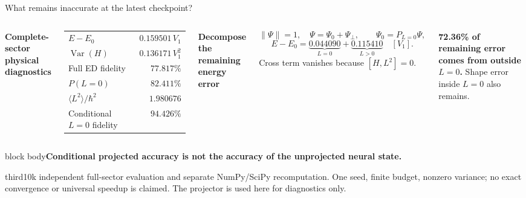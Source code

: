 \documentclass[aspectratio=169,10pt]{beamer}
\newcommand{\src}[1]{\vfill{\fontsize{6.3}{7.5}\selectfont\color{muted}#1\par}}
\newcommand{\take}[1]{\vspace{1mm}\begin{beamercolorbox}[sep=1.6mm,wd=\textwidth]{block body}\small\color{teal}\textbf{#1}\end{beamercolorbox}}
\begin{document}
\begin{frame}{What remains inaccurate at the latest checkpoint?}
\begin{columns}[T,onlytextwidth]
\textbf{Complete-sector physical diagnostics}\par\medskip
\small\renewcommand{\arraystretch}{1.35}
\begin{tabular}{@{}lr@{}}\toprule
$E-E_0$ & $0.159501\,V_1$\\
$\operatorname{Var}(H)$ & $0.136171\,V_1^2$\\
Full ED fidelity & $77.817\%$\\
$P(L=0)$ & $82.411\%$\\
$\langle L^2\rangle/\hbar^2$ & $1.980676$\\
Conditional $L=0$ fidelity & $94.426\%$\\\bottomrule
\end{tabular}
\textbf{Decompose the remaining energy error}\par
\[
\|\Psi\|=1,\quad\Psi=\Psi_0+\Psi_\perp,\qquad
\Psi_0=P_{L=0}\Psi,
\]
\[
E-E_0=
\underbrace{0.044090}_{L=0}
+\underbrace{0.115410}_{L>0}\quad[V_1].
\]
\small Cross term vanishes because $[H,L^2]=0$.\par\medskip
\textbf{72.36\% of remaining error comes from outside $L=0$.} Shape error inside $L=0$ also remains.
\end{columns}
\take{Conditional projected accuracy is not the accuracy of the unprojected neural state.}
\src{third10k independent full-sector evaluation and separate NumPy/SciPy recomputation. One seed, finite budget, nonzero variance; no exact convergence or universal speedup is claimed. The projector is used here for diagnostics only.}
\end{frame}
\end{document}

